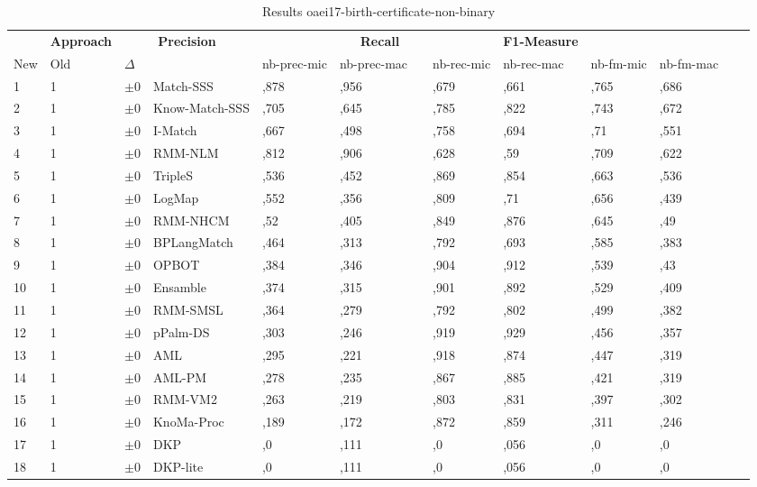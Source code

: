 \begin{table}[htb]
\setlength{\tabcolsep}{0.5em}
\centering
\scriptsize
\begin{tabular}[tb]{lllp{2.3cm}llllllllll}
\noalign{\smallskip}\hline\noalign{\smallskip}
\multicolumn{3}{c}{\textbf{Rank}}& \textbf{Approach}  & \multicolumn{2}{c}{\textbf{Precision}}  & \hspace*{1mm}  & \multicolumn{2}{c}{\textbf{Recall}}  & \hspace*{1mm}  & \multicolumn{2}{c}{\textbf{F1-Measure}}  & \hspace*{1mm} \\
New & Old & $\Delta$ & &nb-prec-mic & nb-prec-mac && nb-rec-mic & nb-rec-mac && nb-fm-mic & nb-fm-mac\\
\noalign{\smallskip}\hline\noalign{\smallskip}
1 & 1 		& $\pm$0 &Match-SSS    	&	,878 & ,956 & & ,679 & ,661 & & ,765 & ,686\\
2 & 1 		& $\pm$0 &Know-Match-SSS    	&	,705 & ,645 & & ,785 & ,822 & & ,743 & ,672\\
3 & 1 		& $\pm$0 &I-Match    	&	,667 & ,498 & & ,758 & ,694 & & ,71 & ,551\\
4 & 1 		& $\pm$0 &RMM-NLM    	&	,812 & ,906 & & ,628 & ,59 & & ,709 & ,622\\
5 & 1 		& $\pm$0 &TripleS    	&	,536 & ,452 & & ,869 & ,854 & & ,663 & ,536\\
6 & 1 		& $\pm$0 &LogMap    	&	,552 & ,356 & & ,809 & ,71 & & ,656 & ,439\\
7 & 1 		& $\pm$0 &RMM-NHCM    	&	,52 & ,405 & & ,849 & ,876 & & ,645 & ,49\\
8 & 1 		& $\pm$0 &BPLangMatch    	&	,464 & ,313 & & ,792 & ,693 & & ,585 & ,383\\
9 & 1 		& $\pm$0 &OPBOT    	&	,384 & ,346 & & ,904 & ,912 & & ,539 & ,43\\
10 & 1 		& $\pm$0 &Ensamble    	&	,374 & ,315 & & ,901 & ,892 & & ,529 & ,409\\
11 & 1 		& $\pm$0 &RMM-SMSL    	&	,364 & ,279 & & ,792 & ,802 & & ,499 & ,382\\
12 & 1 		& $\pm$0 &pPalm-DS    	&	,303 & ,246 & & ,919 & ,929 & & ,456 & ,357\\
13 & 1 		& $\pm$0 &AML    	&	,295 & ,221 & & ,918 & ,874 & & ,447 & ,319\\
14 & 1 		& $\pm$0 &AML-PM    	&	,278 & ,235 & & ,867 & ,885 & & ,421 & ,319\\
15 & 1 		& $\pm$0 &RMM-VM2    	&	,263 & ,219 & & ,803 & ,831 & & ,397 & ,302\\
16 & 1 		& $\pm$0 &KnoMa-Proc    	&	,189 & ,172 & & ,872 & ,859 & & ,311 & ,246\\
17 & 1 		& $\pm$0 &DKP    	&	,0 & ,111 & & ,0 & ,056 & & ,0 & ,0\\
18 & 1 		& $\pm$0 &DKP-lite    	&	,0 & ,111 & & ,0 & ,056 & & ,0 & ,0\\
\end{tabular}
\caption{Results oaei17-birth-certificate-non-binary}
\label{tbl:results}
\end{table}